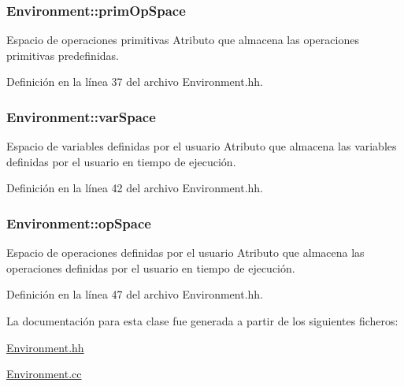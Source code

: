 \subsubsection[{\texorpdfstring{prim\+Op\+Space}{primOpSpace}}]{ Environment\+::prim\+Op\+Space\hspace{0.3cm}{\ttfamily [private]}}\hypertarget{class_environment_a7855273ad2d19ab036495980841e20a4}{}\label{class_environment_a7855273ad2d19ab036495980841e20a4}


Espacio de operaciones primitivas Atributo que almacena las operaciones primitivas predefinidas. 



Definición en la línea 37 del archivo Environment.\+hh.

\subsubsection[{\texorpdfstring{var\+Space}{varSpace}}]{ Environment\+::var\+Space\hspace{0.3cm}{\ttfamily [private]}}\hypertarget{class_environment_aedf0507f98713f9eb6c152d93c346aa4}{}\label{class_environment_aedf0507f98713f9eb6c152d93c346aa4}


Espacio de variables definidas por el usuario Atributo que almacena las variables definidas por el usuario en tiempo de ejecución. 



Definición en la línea 42 del archivo Environment.\+hh.

\subsubsection[{\texorpdfstring{op\+Space}{opSpace}}]{ Environment\+::op\+Space\hspace{0.3cm}{\ttfamily [private]}}\hypertarget{class_environment_a7ab0af9a002f7df22966678a0dd0c366}{}\label{class_environment_a7ab0af9a002f7df22966678a0dd0c366}


Espacio de operaciones definidas por el usuario Atributo que almacena las operaciones definidas por el usuario en tiempo de ejecución. 



Definición en la línea 47 del archivo Environment.\+hh.



La documentación para esta clase fue generada a partir de los siguientes ficheros\+:\begin{DoxyCompactItemize}
\item 
\hyperlink{_environment_8hh}{Environment.\+hh}\item 
\hyperlink{_environment_8cc}{Environment.\+cc}\end{DoxyCompactItemize}
